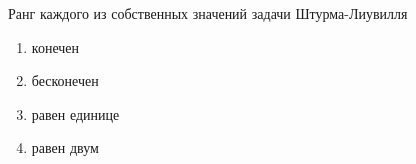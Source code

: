 Ранг каждого из собственных значений задачи Штурма-Лиувилля

\begin{enumerate}[label=\arabic*)]
    \item конечен
    \item бесконечен
    \item равен единице
    \item равен двум
\end{enumerate}

